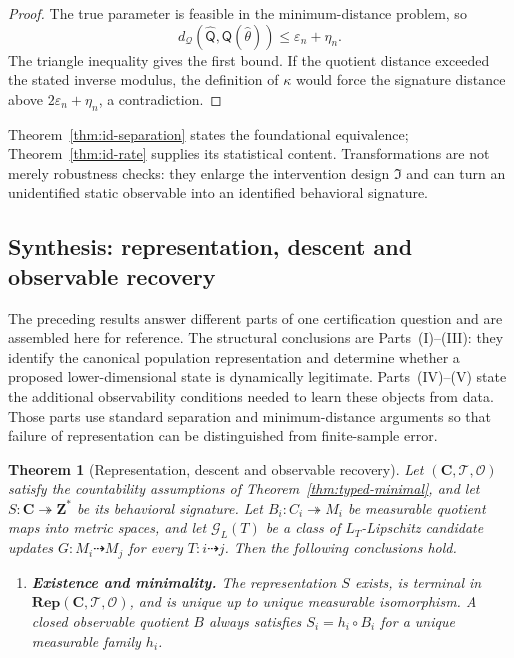 \documentclass[11pt]{article}
\newtheorem{theorem}[definition]{Theorem}
\begin{document}
{\begin{proof}
The true parameter is feasible in the minimum-distance problem, so
\[
 d_{\mathcal Q}(\widehat{\mathsf Q},\mathsf Q(\widehat\theta))
 \le\varepsilon_n+\eta_n.
\]
The triangle inequality gives the first bound. If the quotient distance exceeded the stated inverse modulus, the definition of $\kappa$ would force the signature distance above $2\varepsilon_n+\eta_n$, a contradiction.
\end{proof}

Theorem~\ref{thm:id-separation} states the foundational equivalence; Theorem~\ref{thm:id-rate} supplies its statistical content. Transformations are not merely robustness checks: they enlarge the intervention design $\mathfrak I$ and can turn an unidentified static observable into an identified behavioral signature.

\subsection{Synthesis: representation, descent and observable recovery}

The preceding results answer different parts of one certification question and
are assembled here for reference.  The structural conclusions are
Parts~(I)--(III): they identify the canonical population representation and
determine whether a proposed lower-dimensional state is dynamically
legitimate.  Parts~(IV)--(V) state the additional observability conditions
needed to learn these objects from data.  Those parts use standard separation
and minimum-distance arguments so that failure of representation can be
distinguished from finite-sample error.

\begin{theorem}[Representation, descent and observable recovery]\label{thm:central}
Let $(\mathbf C,\mathcal T,\mathcal O)$ satisfy the countability assumptions of Theorem~\ref{thm:typed-minimal}, and let $S:\mathbf C\twoheadrightarrow\mathbf Z^*$ be its behavioral signature. Let $B_i:C_i\twoheadrightarrow M_i$ be measurable quotient maps into metric spaces, and let $\mathcal G_L(T)$ be a class of $L_T$-Lipschitz candidate updates $G:M_i\dashrightarrow M_j$ for every $T:i\dashrightarrow j$. Then the following conclusions hold.
\begin{enumerate}
\item[\textup{(I)}] \textbf{Existence and minimality.} The representation $S$ exists, is terminal in $\mathbf{Rep}(\mathbf C,\mathcal T,\mathcal O)$, and is unique up to unique measurable isomorphism. A closed observable quotient $B$ always satisfies $S_i=h_i\circ B_i$ for a unique measurable family $h_i$.


\end{enumerate}
\end{theorem}}
\end{document}
